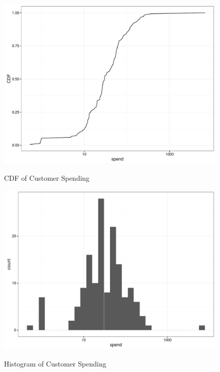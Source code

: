 \begin{figure}[!htb]
  \centering
  \caption{CDF of Customer Spending}
  \includegraphics[scale=.5]{cust_spend_cdf.pdf}
  \label{fig:cust_spend_cdf}
\end{figure}

\begin{figure}[!htb]
  \centering
  \caption{Histogram of Customer Spending}
  \includegraphics[scale=.5]{cust_spend_hist.pdf}
  \label{fig:cust_spend_hist}
\end{figure}


